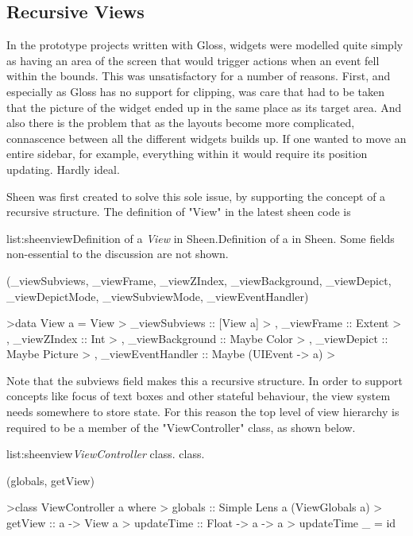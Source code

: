 \subsection{Recursive Views}

In the prototype projects written with Gloss, widgets were modelled quite simply as having an area of the screen that would trigger actions when an event fell within the bounds. This was unsatisfactory  for a number of reasons. First, and especially as Gloss has no support for clipping, was care that had to be taken that the picture of the widget ended up in the same place as its target area. And also there is the problem that as the layouts become more complicated, connascence between all the different widgets builds up. If one wanted to move an entire sidebar, for example, everything within it would require its position updating. Hardly ideal.

Sheen was first created to solve this sole issue, by supporting the concept of a recursive structure. The definition of "View" in the latest sheen code is

\vspace{-0.5em}
\begin{listing}{list:sheenview}{Definition of a \emph{View} in Sheen.}{Definition of a  in Sheen. Some fields non-essential to the discussion are not shown.}{}
\end{listing}\vspace{-1.5em}

\functions(_viewSubviews, _viewFrame, _viewZIndex, _viewBackground, _viewDepict, _viewDepictMode, _viewSubviewMode, _viewEventHandler)
\begin{haskell}

>data View a = View
>  {  _viewSubviews     :: [View a]
>  ,  _viewFrame        :: Extent
>  ,  _viewZIndex       :: Int
>  ,  _viewBackground   :: Maybe Color
>  ,  _viewDepict       :: Maybe Picture
>  ,  _viewEventHandler :: Maybe (UIEvent -> a)
>  }

\end{haskell}
\noindent 
Note that the subviews field makes this a recursive structure. In order to support concepts like focus of text boxes and other stateful behaviour, the view system needs somewhere to store state. For this reason the top level of view hierarchy is required to be a member of the "ViewController" class, as shown below.

\vspace{-0.5em}
\begin{listing}{list:sheenview}{\emph{ViewController} class.}{ class.}{}
\end{listing}\vspace{-1.5em}

\functions(globals, getView)
\begin{haskell}

>class ViewController a where
>  globals :: Simple Lens a (ViewGlobals a)
>  getView :: a -> View a
>  updateTime :: Float -> a -> a
>  updateTime _ = id

\end{haskell}
\noindent 

